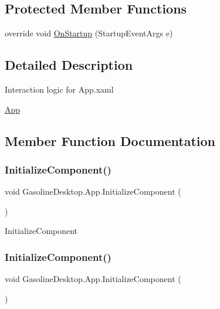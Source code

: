 \subsection*{Protected Member Functions}
\begin{DoxyCompactItemize}
\item 
override void \mbox{\hyperlink{class_gasoline_desktop_1_1_app_a04c8db2e214243305f17da4a84b44b89}{On\+Startup}} (Startup\+Event\+Args e)
\end{DoxyCompactItemize}


\subsection{Detailed Description}
Interaction logic for App.\+xaml 

\mbox{\hyperlink{class_gasoline_desktop_1_1_app}{App}}

\subsection{Member Function Documentation}
\mbox{\label{class_gasoline_desktop_1_1_app_a5da1449612f8c2613f446c2e9ab36a7b}} 
\subsubsection{\texorpdfstring{InitializeComponent()}{InitializeComponent()}\hspace{0.1cm}{\footnotesize\ttfamily [1/2]}}
{\footnotesize\ttfamily void Gasoline\+Desktop.\+App.\+Initialize\+Component (\begin{DoxyParamCaption}{ }\end{DoxyParamCaption})}



Initialize\+Component 

\mbox{\label{class_gasoline_desktop_1_1_app_a5da1449612f8c2613f446c2e9ab36a7b}} 
\subsubsection{\texorpdfstring{InitializeComponent()}{InitializeComponent()}\hspace{0.1cm}{\footnotesize\ttfamily [2/2]}}
{\footnotesize\ttfamily void Gasoline\+Desktop.\+App.\+Initialize\+Component (\begin{DoxyParamCaption}{ }\end{DoxyParamCaption})}



